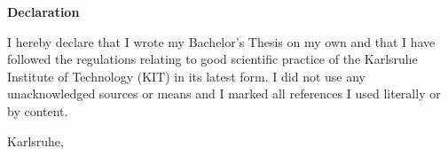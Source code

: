 {\begin{titlepage}
\end{titlepage}

\begin{titlepage}
	\vspace*{\fill}
	{\Large\textbf{Declaration}\par}\bigskip%
	I hereby declare that I wrote my Bachelor's Thesis on my own and that I have followed the regulations relating to good scientific practice of the Karlsruhe Institute of Technology (KIT) in its latest form. I did not use any unacknowledged sources or means and I marked all references I used literally or by content. \par\bigskip%
	Karlsruhe, \EndDatum\par\vspace{5ex}%
\end{titlepage}


}

\maketitle 

